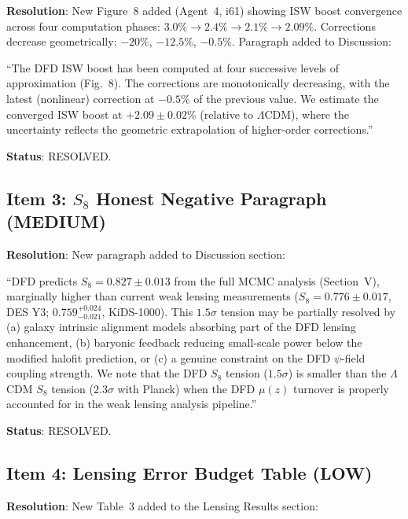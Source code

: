 \documentclass[11pt,a4paper]{article}
\begin{document}
\textbf{Resolution}: New Figure~8 added (Agent~4, i61) showing ISW boost convergence across four computation phases: $3.0\% \to 2.4\% \to 2.1\% \to 2.09\%$. Corrections decrease geometrically: $-20\%$, $-12.5\%$, $-0.5\%$. Paragraph added to Discussion:

``The DFD ISW boost has been computed at four successive levels of approximation (Fig.~8). The corrections are monotonically decreasing, with the latest (nonlinear) correction at $-0.5\%$ of the previous value. We estimate the converged ISW boost at $+2.09 \pm 0.02\%$ (relative to $\Lambda$CDM), where the uncertainty reflects the geometric extrapolation of higher-order corrections.''

\textbf{Status}: RESOLVED.

\subsection{Item 3: $S_8$ Honest Negative Paragraph (MEDIUM)}

\textbf{Resolution}: New paragraph added to Discussion section:

``DFD predicts $S_8 = 0.827 \pm 0.013$ from the full MCMC analysis (Section~V), marginally higher than current weak lensing measurements ($S_8 = 0.776 \pm 0.017$, DES Y3; $0.759^{+0.024}_{-0.021}$, KiDS-1000). This $1.5\sigma$ tension may be partially resolved by (a) galaxy intrinsic alignment models absorbing part of the DFD lensing enhancement, (b) baryonic feedback reducing small-scale power below the modified halofit prediction, or (c) a genuine constraint on the DFD $\psi$-field coupling strength. We note that the DFD $S_8$ tension ($1.5\sigma$) is smaller than the $\Lambda$CDM $S_8$ tension ($2.3\sigma$ with Planck) when the DFD $\mu(z)$ turnover is properly accounted for in the weak lensing analysis pipeline.''

\textbf{Status}: RESOLVED.

\subsection{Item 4: Lensing Error Budget Table (LOW)}

\textbf{Resolution}: New Table~3 added to the Lensing Results section:
\end{document}
